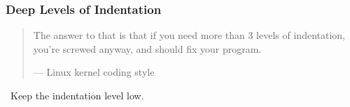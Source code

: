 \begin{frame}

\frametitle{Deep Levels of Indentation}

\begin{quotation}

\footnotesize\sffamily\itshape

\begin{flushright}

The answer to that is that if you need more than 3 levels of indentation,
you're screwed anyway, and should fix your program.

\smallbreak

\upshape

--- Linux kernel coding style

\end{flushright}

\end{quotation}

\vspace{\fill}

\begin{center}

\leftthumbsup~Keep the indentation level low.~\rightthumbsup

\end{center}

\vspace{\fill}

\end{frame}

